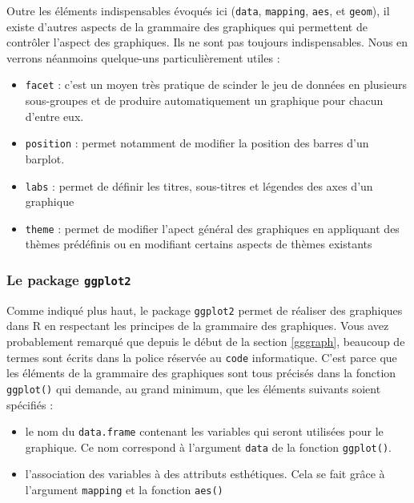 \documentclass[a4paperpaper,]{article}
\providecommand{\tightlist}{%
  \setlength{\itemsep}{0pt}\setlength{\parskip}{0pt}}
\theoremstyle{definition}
\theoremstyle{definition}
\theoremstyle{definition}
\theoremstyle{remark}
\begin{document}
Outre les éléments indispensables évoqués ici (\texttt{data},
\texttt{mapping}, \texttt{aes}, et \texttt{geom}), il existe d'autres
aspects de la grammaire des graphiques qui permettent de contrôler
l'aspect des graphiques. Ils ne sont pas toujours indispensables. Nous
en verrons néanmoins quelque-uns particulièrement utiles :

\begin{itemize}
\tightlist
\item
  \texttt{facet} : c'est un moyen très pratique de scinder le jeu de
  données en plusieurs sous-groupes et de produire automatiquement un
  graphique pour chacun d'entre eux.
\item
  \texttt{position} : permet notamment de modifier la position des
  barres d'un barplot.
\item
  \texttt{labs} : permet de définir les titres, sous-titres et légendes
  des axes d'un graphique
\item
  \texttt{theme} : permet de modifier l'apect général des graphiques en
  appliquant des thèmes prédéfinis ou en modifiant certains aspects de
  thèmes existants
\end{itemize}

\subsubsection{\texorpdfstring{Le package
\texttt{ggplot2}}{Le package ggplot2}}\label{le-package-ggplot2}

Comme indiqué plus haut, le package \texttt{ggplot2} \citep{R-ggplot2}
permet de réaliser des graphiques dans R en respectant les principes de
la grammaire des graphiques. Vous avez probablement remarqué que depuis
le début de la section \ref{gggraph}, beaucoup de termes sont écrits
dans la police réservée au \texttt{code} informatique. C'est parce que
les éléments de la grammaire des graphiques sont tous précisés dans la
fonction \texttt{ggplot()} qui demande, au grand minimum, que les
éléments suivants soient spécifiés :

\begin{itemize}
\tightlist
\item
  le nom du \texttt{data.frame} contenant les variables qui seront
  utilisées pour le graphique. Ce nom correspond à l'argument
  \texttt{data} de la fonction \texttt{ggplot()}.
\item
  l'association des variables à des attributs esthétiques. Cela se fait
  grâce à l'argument \texttt{mapping} et la fonction \texttt{aes()}
\end{itemize}
\end{document}
